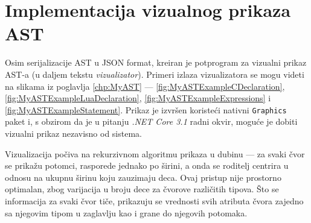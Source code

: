 \section{Implementacija vizualnog prikaza AST}
\label{sec:ImplementationVisualizer}

Osim serijalizacije AST u JSON format, kreiran je potprogram za vizualni prikaz AST-a (u daljem tekstu \emph{vizualizator}). Primeri izlaza vizualizatora se mogu videti na slikama iz poglavlja \ref{chp:MyAST} --- \ref{fig:MyASTExampleCDeclaration}, \ref{fig:MyASTExampleLuaDeclaration}, \ref{fig:MyASTExampleExpressions} i \ref{fig:MyASTExampleStatement}. Prikaz je izvršen koristeći nativni \texttt{Graphics} paket i, s obzirom da je u pitanju \emph{.NET Core 3.1} radni okvir, moguće je dobiti vizualni prikaz nezavisno od sistema.

Vizualizacija počiva na rekurzivnom algoritmu prikaza u dubinu --- za svaki čvor se prikažu potomci, rasporede jednako po širini, a onda se roditelj centrira u odnosu na ukupnu širinu koju zauzimaju deca. Ovaj pristup nije prostorno optimalan, zbog varijacija u broju dece za čvorove različitih tipova. Što se informacija za svaki čvor tiče, prikazuju se vrednosti svih atributa čvora zajedno sa njegovim tipom u zaglavlju kao i grane do njegovih potomaka.
